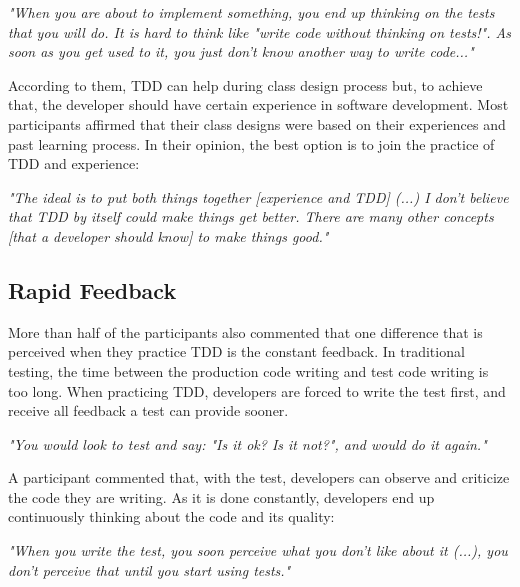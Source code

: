 \documentclass[times]{elsarticle}
\begin{document}
\begin{framed}

	\textit{"When you are about to implement something, you end up thinking on the tests that you will do. 
	It is hard to think like "write code without thinking on tests!". As soon as you get used to it, 
	you just don't know another way to write code..."}
	
\end{framed}

According to them, TDD can help during class design process but, to achieve that,
the developer should have certain experience in software development. Most participants
affirmed that their class designs were based on their experiences and past learning process.
In their opinion, the best option is to join the practice of TDD and experience:

\begin{framed}

	\textit{"The ideal is to put both things together [experience and TDD] (...) 
	I don't believe that TDD by itself could make things get better. There are many other
	concepts [that a developer should know] to make things good."}

\end{framed}

\subsection{Rapid Feedback}

More than half of the participants also commented that one difference that is
perceived when they practice TDD is the constant feedback. In traditional testing,
the time between the production code writing and test code writing is too long.
When practicing TDD, developers are forced to write the test first, and receive all
feedback a test can provide sooner.

\begin{framed}
	\textit{"You would look to test and say: "Is it ok? Is it not?", and would do it again."}
\end{framed}

A participant commented that, with the test, developers can observe
and criticize the code they are writing. As it is done constantly,
developers end up continuously thinking about the code and its
quality:

\begin{framed}
	\textit{"When you write the test, you soon perceive what you don't like about it (...), 
	you don't perceive that until you start using tests."}
\end{framed}
\end{document}
